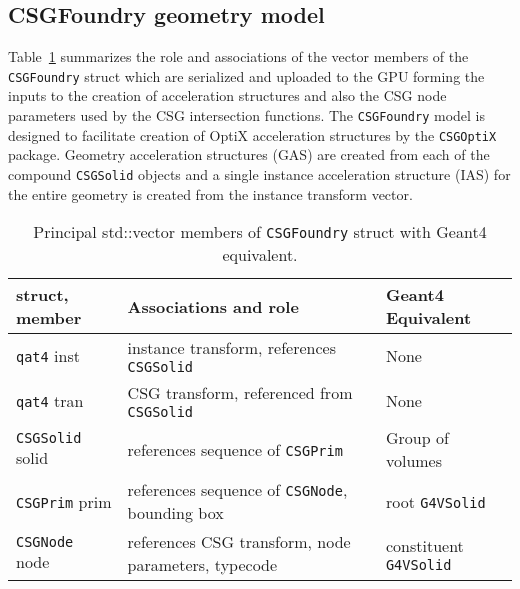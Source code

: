 \documentclass{webofc}
\begin{document}
\subsection{CSGFoundry geometry model}
%
Table~\ref{tabcsgfoundry} summarizes the role and associations of the vector members 
of the {\tt CSGFoundry} struct which are serialized and uploaded to the GPU 
forming the inputs to the creation of acceleration structures and also the CSG node 
parameters used by the CSG intersection functions. 
%
The {\tt CSGFoundry} model is designed to facilitate creation 
of OptiX acceleration structures by the {\tt CSGOptiX} package. 
Geometry acceleration structures (GAS) are created from each of the 
compound {\tt CSGSolid} objects and a single instance acceleration structure (IAS)
for the entire geometry is created from the instance transform vector. 
%
%
%
\begin{center}
\begin{table}
\begin{tabular}{ |m{22mm}|m{80mm}|m{16mm}| } 
 \hline
 struct, member        & Associations and role                                                          & Geant4 Equivalent   \\
\hline\hline 
 {\tt qat4} inst       & instance transform, references {\tt CSGSolid}                                  &  None               \\
\hline 
 {\tt qat4} tran       & CSG transform, referenced from {\tt CSGSolid}                                  &  None               \\
\hline 
 {\tt CSGSolid} solid  & references sequence of {\tt CSGPrim}                                           & Group of volumes      \\ 
\hline 
 {\tt CSGPrim} prim    & references sequence of {\tt CSGNode}, bounding box                             & root {\tt G4VSolid} \\
\hline 
 {\tt CSGNode} node    & references CSG transform, node parameters, typecode                            & constituent {\tt G4VSolid} \\
 \hline
\end{tabular}
\caption{\label{tabcsgfoundry}Principal std::vector members of {\tt CSGFoundry} struct with Geant4 equivalent. }
\end{table}
\vspace{-8mm}
\end{center}%
%
\end{document}
